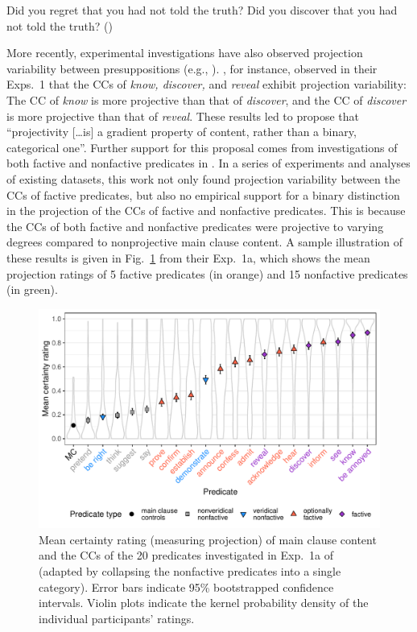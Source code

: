 \documentclass[11pt,fleqn]{article}
\newcommand{\6}{\mbox{$[\hspace*{-.6mm}[$}}
\newcommand{\9}{\mbox{$]\hspace*{-.6mm}]$}}
\begin{document}
\begin{exe}
\ex\label{kart}
\begin{xlist}
\ex Did you regret that you had not told the truth?
\ex Did you discover that you had not told the truth? \hfill (\citealt[63]{karttunen71b})
\end{xlist}
\end{exe}
More recently, experimental investigations have also observed projection variability between presuppositions (e.g., \citealt{xue-onea11,demarneffe-etal-sub23,tbd-variability,degen-tonhauser-language}). \citealt{tbd-variability}, for instance, observed in their Exps.~1 that the CCs of {\em know, discover,} and {\em reveal} exhibit projection variability: The CC of {\em know} is more projective than that of {\em discover}, and the CC of {\em discover} is more projective than that of {\em reveal}. These results led \citealt[498]{tbd-variability} to propose that ``projectivity [\ldots is] a gradient property of content, rather than a binary, categorical one''. Further support for this proposal comes from  investigations of both factive and nonfactive predicates in \citealt{degen-tonhauser-language}. In a series of experiments and analyses of existing datasets, this work not only found projection variability between the CCs of factive predicates, but also no empirical support for a binary distinction in the projection of the CCs of factive and nonfactive predicates. This is because the CCs of both factive and nonfactive predicates were projective to varying degrees compared to nonprojective main clause content. A sample illustration of these results is given in Fig.~\ref{fig:dt1a} from their Exp.~1a, which shows the mean projection ratings of 5 factive predicates (in \color{orange}orange\color{black}) and 15 nonfactive predicates (in \color{green}green\color{black}).

\begin{figure}[h!]
\centering
\includegraphics[width=.8\textwidth]{figures/Language-Figure2}
\caption{Mean certainty rating (measuring projection) of main clause content and the CCs of the 20 predicates investigated in Exp.~1a of \citealt{degen-tonhauser-language} (adapted by collapsing the nonfactive predicates into a single category). Error bars indicate 95\% bootstrapped confidence intervals. Violin plots indicate the kernel probability density of the individual participants' ratings.}\label{fig:dt1a}
\end{figure}
\end{document}
